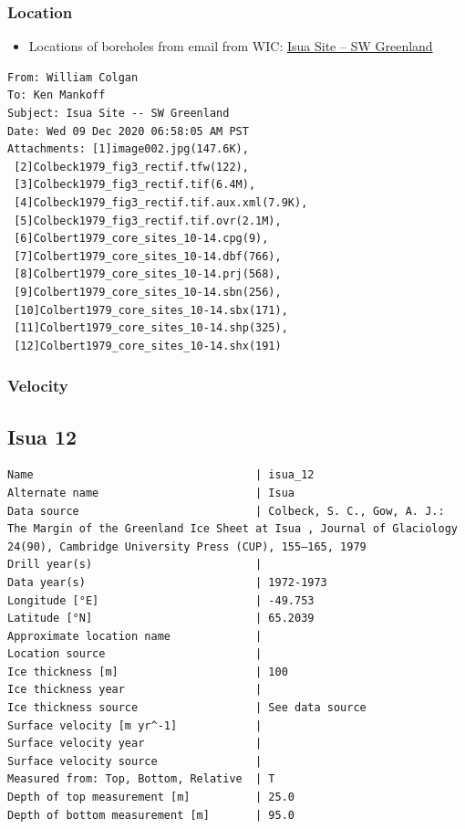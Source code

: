 \documentclass[article,a4paper,times,11pt,twoside]{article}
\begin{document}
\subsubsection{Location}
\label{sec:org8ebafbc}

\begin{itemize}
\item Locations of boreholes from email from WIC: \href{msgid:AM0PR04MB6129F131ECD9123E72752945A2CC0@AM0PR04MB6129.eurprd04.prod.outlook.com}{Isua Site -- SW Greenland}
\end{itemize}

\begin{verbatim}
From: William Colgan
To: Ken Mankoff
Subject: Isua Site -- SW Greenland
Date: Wed 09 Dec 2020 06:58:05 AM PST
Attachments: [1]image002.jpg(147.6K),
 [2]Colbeck1979_fig3_rectif.tfw(122),
 [3]Colbeck1979_fig3_rectif.tif(6.4M),
 [4]Colbeck1979_fig3_rectif.tif.aux.xml(7.9K),
 [5]Colbeck1979_fig3_rectif.tif.ovr(2.1M),
 [6]Colbert1979_core_sites_10-14.cpg(9),
 [7]Colbert1979_core_sites_10-14.dbf(766),
 [8]Colbert1979_core_sites_10-14.prj(568),
 [9]Colbert1979_core_sites_10-14.sbn(256),
 [10]Colbert1979_core_sites_10-14.sbx(171),
 [11]Colbert1979_core_sites_10-14.shp(325),
 [12]Colbert1979_core_sites_10-14.shx(191)
\end{verbatim}

\subsubsection{Velocity}
\label{sec:org2de2f8b}
\clearpage
\subsection{Isua 12}
\label{sec:org59dfe5b}
\begin{verbatim}
Name                                  | isua_12
Alternate name                        | Isua
Data source                           | Colbeck, S. C., Gow, A. J.: The Margin of the Greenland Ice Sheet at Isua , Journal of Glaciology 24(90), Cambridge University Press (CUP), 155–165, 1979 
Drill year(s)                         | 
Data year(s)                          | 1972-1973
Longitude [°E]                        | -49.753
Latitude [°N]                         | 65.2039
Approximate location name             | 
Location source                       | 
Ice thickness [m]                     | 100
Ice thickness year                    | 
Ice thickness source                  | See data source
Surface velocity [m yr^-1]            | 
Surface velocity year                 | 
Surface velocity source               | 
Measured from: Top, Bottom, Relative  | T
Depth of top measurement [m]          | 25.0
Depth of bottom measurement [m]       | 95.0
\end{verbatim}
\end{document}
